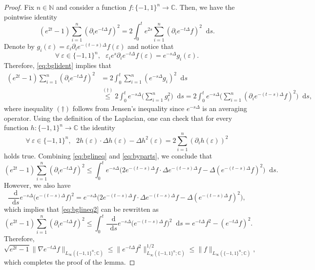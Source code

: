 \documentclass[11pt,reqno]{amsart}
\renewcommand{\leq}{\leqslant}
\newcommand{\e}{\varepsilon}
\newcommand{\1}{\mathbf 1}
\theoremstyle{remark}
\newcommand{\C}{\mathbb C}
\newcommand{\N}{\mathbb N}
\newcommand*\diff{\mathop{}\!\mathrm{d}}
\begin{document}
\begin{proof}
Fix $n\in\N$ and consider a function $f:\{-1,1\}^n\to\C$. Then, we have the pointwise identity
\begin{equation} \label{eq:bglident}
(e^{2t}-1) \sum_{i=1}^n (\partial_i e^{-t\Delta}f)^2 = 2\int_0^t e^{2s} \sum_{i=1}^n (\partial_i e^{-t\Delta}f)^2 \diff s.
\end{equation}
Denote by $g_i(\e) = \e_i \partial_i e^{-(t-s)\Delta}f(\e)$ and notice that
\begin{equation}
\forall \ \e\in\{-1,1\}^n, \ \ \ \e_i e^s \partial_i e^{-t\Delta} f(\e) = e^{-s\Delta} g_i(\e).
\end{equation}
Therefore, \eqref{eq:bglident} implies that
\begin{equation}
\begin{split} \label{eq:bglineq}
(e^{2t}-1) \sum_{i=1}^n (\partial_i e^{-t\Delta}f)^2 & = 2\int_0^t  \sum_{i=1}^n (e^{-s\Delta}g_i)^2 \diff s \\ & \stackrel{(\dagger)}{\leq} 2\int_0^t e^{-s\Delta}\Big( \sum_{i=1}^n g_i^2 \Big) \diff s
 = 2\int_0^t e^{-s\Delta} \Big( \sum_{i=1}^n (\partial_i e^{-(t-s)\Delta}f)^2\Big) \diff s,
\end{split}
\end{equation}
where inequality $(\dagger)$ follows from Jensen's inequality since $e^{-s\Delta}$ is an averaging operator. Using the definition of the Laplacian, one can check that for every function $h:\{-1,1\}^n\to\C$ the identity
\begin{equation} \label{eq:byparts}
\forall \ \e\in\{-1,1\}^n, \ \ \ 2h(\e) \cdot \Delta h(\e) - \Delta h^2(\e) = 2\sum_{i=1}^n (\partial_i h(\e))^2
\end{equation}
holds true. Combining \eqref{eq:bglineq} and \eqref{eq:byparts}, we conclude that
\begin{equation} \label{eq:bglineq2}
(e^{2t}-1) \sum_{i=1}^n (\partial_i e^{-t\Delta}f)^2  \leq \int_0^t  e^{-s\Delta}\big( 2e^{-(t-s)\Delta}f \cdot \Delta e^{-(t-s)\Delta}f - \Delta (e^{-(t-s)\Delta}f)^2 \big) \diff s.
\end{equation}
However, we also have
\begin{equation}
\frac{\diff}{\diff s} e^{-s\Delta}\big( e^{-(t-s)\Delta} f \big)^2 = e^{-s\Delta} \big( 2e^{-(t-s)\Delta}f\cdot \Delta e^{-(t-s)\Delta}f - \Delta (e^{-(t-s)\Delta}f)^2 \big),
\end{equation}
which implies that \eqref{eq:bglineq2} can be rewritten as
\begin{equation} \label{eq:useinnextremark}
(e^{2t}-1) \sum_{i=1}^n (\partial_i e^{-t\Delta}f)^2  \leq \int_0^t \frac{\diff}{\diff s} e^{-s\Delta}\big( e^{-(t-s)\Delta} f\big)^2 \diff s = e^{-t\Delta} f^2 - (e^{-t\Delta} f)^2.
\end{equation}
Therefore,
\begin{equation}
\sqrt{e^{2t}-1} \|\nabla e^{-t\Delta} f\|_{L_\infty(\{-1,1\}^n;\C)} \leq \|e^{-t\Delta} f^2\|_{L_\infty(\{-1,1\}^n;\C)}^{1/2} \leq \|f\|_{L_\infty(\{-1,1\}^n;\C)},
\end{equation}
which completes the proof of the lemma.
\end{proof}
\end{document}
